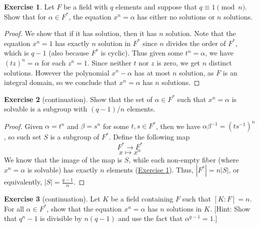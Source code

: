 \documentclass{article}
\theoremstyle{definition}
\newtheorem{exercise}{Exercise}
\begin{document}
\begin{exercise} \label{c7-ex-3}
Let $F$ be a field with $q$ elements and suppose that $q \equiv 1 \pmod{n}$. Show that for $\alpha \in F^*$, the equation $x^n = \alpha$ has either no solutions or $n$ solutions.
\end{exercise}
\begin{proof}
We show that if it has solution, then it has $n$ solution. Note that the equation $x^n = 1$ has exactly $n$ solution in $F^*$ since $n$ divides the order of $F^*$, which is $q - 1$ (also because $F^*$ is cyclic). Thus given some $t^n = \alpha$, we have $(tz)^n = \alpha$ for each $z^n = 1$. Since neither $t$ nor $z$ is zero, we get $n$ distinct solutions. However the polynomial $x^n - \alpha$ has at most $n$ solution, as $F$ is an integral domain, so we conclude that $x^n = \alpha$ has $n$ solutions.
\end{proof}
\begin{exercise}[continuation]
Show that the set of $\alpha \in F^*$ such that $x^n = \alpha$ is solvable is a subgroup with $(q - 1)/n$ elements.
\end{exercise}
\begin{proof}
Given $\alpha = t^n$ and $\beta = s^n$ for some $t, s \in F^*$, then we have $\alpha \beta^{-1} = (ts^{-1})^n$, so such set $S$ is a subgroup of $F^*$. Define the following map
$$F^* \to F^*$$
$$x \mapsto x^n$$
We know that the image of the map is $S$, while each non-empty fiber (where $x^n = \alpha$ is solvable) has exactly $n$ elements (\hyperref[c7-ex-3]{Exercise \ref*{c7-ex-3}}). Thus, $|F^*| = n |S|$, or equivalently, $|S| = \frac{q - 1}{n}$.
\end{proof}
\begin{exercise}[continuation] \label{c7-ex-5}
Let $K$ be a field containing $F$ such that $[K : F] = n$. For all $\alpha \in F^*$, show that the equation $x^n = \alpha$ has $n$ solutions in $K$. [Hint: Show that $q^n-1$ is divisible by $n(q - 1)$ and use the fact that $\alpha^{q - 1} = 1$.]
\end{exercise}
\end{document}
